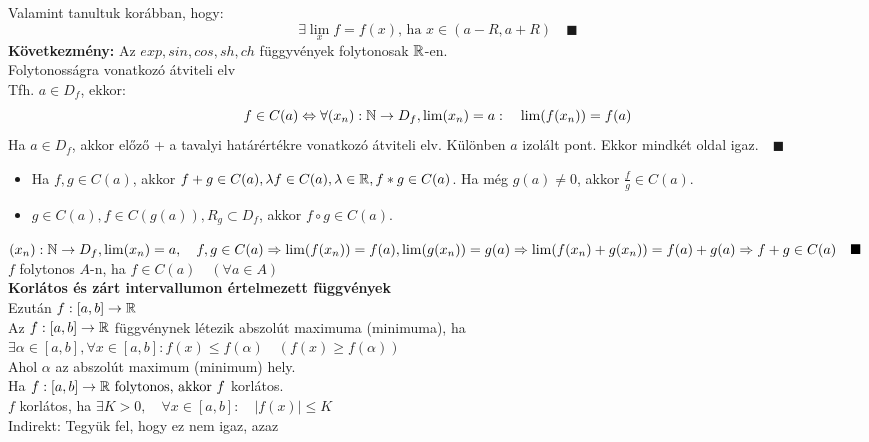 \documentclass[a4paper,11pt]{article}
\begin{document}
Valamint tanultuk korábban, hogy:\[\exists\lim_x f=f(x)\text{, ha }x\in(a-R,a+R)\quad\blacksquare\]\textbf{Következmény:} Az $exp,sin,cos,sh,ch$ függyvények folytonosak $\mathbb{R}$-en.\\[0.2cm]
\tetel Folytonosságra vonatkozó átviteli elv\\[0.1cm] Tfh. $a\in D_f$, ekkor:
\[f\in C(a)\Leftrightarrow\forall(x_n):\mathbb{N}\to D_f, \lim(x_n)=a:\quad\lim(f(x_n))=f(a)\]
\biz Ha $a\in D_f$, akkor előző + a tavalyi határértékre vonatkozó átviteli elv. Különben $a$ izolált pont. Ekkor mindkét oldal igaz.$\quad\blacksquare$\\[0.1cm] \tetel
\begin{itemize}
	\item Ha $f,g\in C(a)$, akkor $f+g\in C(a),\lambda f\in C(a), \lambda\in\mathbb{R},f*g\in C(a)$. Ha még $g(a)\neq0$, akkor $\frac{f}{g}\in C(a)$.
	\item $g\in C(a), f\in C(g(a)), R_g\subset D_f$, akkor $f\circ g\in C(a)$.
\end{itemize}
\newpage\biz $(x_n):\mathbb{N}\to D_f, \lim(x_n)=a,\quad f,g\in C(a)\Rightarrow \lim(f(x_n))=f(a), \lim(g(x_n))=g(a)\\[0.1cm]\Rightarrow\lim(f(x_n)+g(x_n))= f(a)+g(a)\Rightarrow f+g\in C(a)\quad\blacksquare$\\[0.2cm] $f$ folytonos $A$-n, ha $f\in C(a)\quad(\forall a\in A)$\\[0.3cm]
\textbf{{\large Korlátos és zárt intervallumon értelmezett függvények}}\\[0.2cm]
Ezután $f:[a,b]\to\mathbb{R}$\\[0.2cm]  Az $f:[a,b]\to\mathbb{R}$ függvénynek létezik abszolút maximuma (minimuma), ha\\[0.2cm] $\exists\alpha\in[a,b],\forall x\in [a,b]:f(x)\leq f(\alpha)\quad (f(x)\geq f(\alpha))$\\[0.1cm] Ahol $\alpha$ az abszolút maximum (minimum) hely.\\[0.2cm]
\tetel Ha $f:[a,b]\to\mathbb{R} \text{ folytonos, akkor } f $ korlátos. \\[0.1cm]	
\biz $f$ korlátos, ha $\exists K>0, \quad \forall x \in [a,b]: \quad |f(x)|\leq K$ \\[0.1cm]
Indirekt: Tegyük fel, hogy ez nem igaz, azaz\\[0.2cm]	
\end{document}
